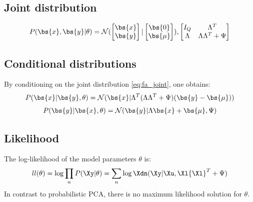 \documentclass[a4paper]{article}
\begin{document}
\subsection{Joint distribution}
\begin{align}
  P(\bs{x}, \bs{y}|\theta)=\mathcal{N}(
  \begin{bmatrix}
  \bs{x} \\ \bs{y} \end{bmatrix} |
  \begin{bmatrix}
    \bs{0} \\
    \bs{\mu}
  \end{bmatrix}),
  \begin{bmatrix}
    I_Q & \Lambda^T \\
    \Lambda & \Lambda\Lambda^T + \Psi
    \label{eq:fa_joint}
  \end{bmatrix}
\end{align}

\subsection{Conditional distributions}
By conditioning on the joint distribution \ref{eq:fa_joint}, one obtains:
\begin{align}
  P(\bs{x}|\bs{y},\theta)=\mathcal{N}(\bs{x}|\Lambda^T(\Lambda\Lambda^T+\Psi)(\bs{y}-\bs{\mu}))
\end{align}
\begin{align}
  P(\bs{y}|\bs{x},\theta)=\mathcal{N}(\bs{y}|\Lambda\bs{x}+\bs{\mu},\Psi)
\end{align}

\subsection{Likelihood}
The log-likelihood of the model parameters $\theta$ is:
\begin{align}
  ll(\theta)=\log\prod_n P(\Xy|\theta)=\sum_n\log \Xdn(\Xy|\Xu,\Xl{\Xl}^T+\Psi)
\end{align}
In contrast to probabilistic PCA, there is no maximum likelihood solution for $\theta$.

\newpage
\end{document}

